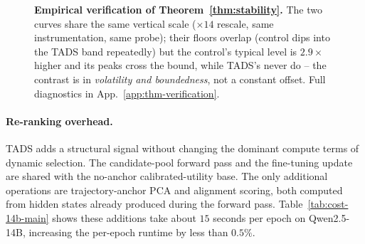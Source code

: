\begin{figure}[t]
{%
}
\caption{\textbf{Empirical verification of
Theorem~\ref{thm:stability}.}
The two curves share the same vertical scale ($\times 14$ rescale,
same instrumentation, same probe); their floors overlap (control
dips into the \textsc{TADS} band repeatedly) but the control's
typical level is $2.9\times$ higher and its peaks cross the bound,
while \textsc{TADS}'s never do -- the contrast is in
\emph{volatility and boundedness}, not a constant offset. Full
diagnostics in App.~\ref{app:thm-verification}.}
\label{fig:thm-main}
\end{figure}

\paragraph{Re-ranking overhead.}
\textsc{TADS} adds a structural signal without changing the
dominant compute terms of dynamic selection. The candidate-pool
forward pass and the fine-tuning update are shared with the
no-anchor calibrated-utility base. The only additional operations
are trajectory-anchor PCA and alignment scoring, both computed
from hidden states already produced during the forward pass.
Table~\ref{tab:cost-14b-main} shows these additions take about
$15$ seconds per epoch on Qwen2.5-14B, increasing the per-epoch
runtime by less than $0.5\%$.


